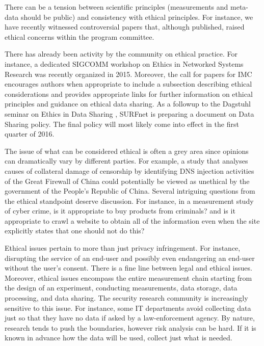 There can be a tension between scientific principles (measurements and
meta-data should be public) and consistency with ethical principles.  For
instance, we have recently witnessed controversial papers
\cite{sburnett:sigcomm:2015, mdischinger:imc:2007} that, although published,
raised ethical concerns within the program committee.

There has already been activity by the community on ethical practice. For
instance, a dedicated SIGCOMM workshop on Ethics in Networked Systems Research
\cite{ethics} was recently organized in 2015. Moreover, the call for papers
for \ac{IMC} encourages authors when appropriate to include a subsection
describing ethical considerations and provides appropriate links for further
information on ethical principles \cite{menloreport} and guidance
\cite{mallman:imc:2007} on ethical data sharing. As a followup to the Dagstuhl
seminar on Ethics in Data Sharing \cite{jcohen:dagstuhl:2014,
roland:creds:2014}, SURFnet is preparing a document \cite{roland:tnc:2015} on
Data Sharing policy.  The final policy will most likely come into effect in
the first quarter of 2016.

The issue of what can be considered ethical is often a grey area since
opinions can dramatically vary by different parties. For example, a study
\cite{anonymous:ccr:2012} that analyses causes of collateral damage of
censorship by identifying DNS injection activities of the Great Firewall of
China could potentially be viewed as unethical by the government of the
People's Republic of China.  Several intriguing questions from the ethical
standpoint deserve discussion.  For instance, in a measurement study of cyber
crime, is it appropriate to buy products from criminals? and is it appropriate
to crawl a website to obtain all of the information even when the site
explicitly states that one should not do this?


Ethical issues pertain to more than just privacy infringement. For instance,
disrupting the service of an end-user and possibly even endangering an
end-user without the user's consent. There is a fine line between legal and
ethical issues. Moreover, ethical issues encompass the entire measurement
chain starting from the design of an experiment, conducting measurements, data
storage, data processing, and data sharing. The security research community is
increasingly sensitive to this issue. For instance, some IT departments avoid
collecting data just so that they have no data if asked by a law-enforcement
agency. By nature, research tends to push the boundaries, however risk
analysis can be hard. If it is known in advance how the data will be used,
collect just what is needed.


